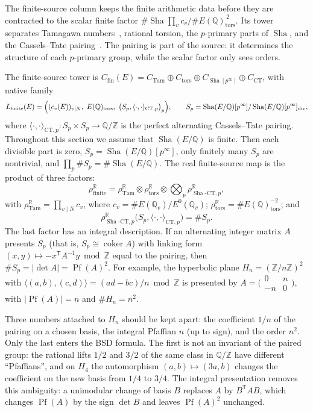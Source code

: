 \documentclass[11pt]{article}
\theoremstyle{definition}
\newcommand{\Q}{\mathbb{Q}}
\newcommand{\R}{\mathbb{R}}
\newcommand{\Z}{\mathbb{Z}}
\newcommand{\Sha}{\operatorname{Sha}}
\newcommand{\tors}{\operatorname{tors}}
\newcommand{\Pf}{\operatorname{Pf}}
\begin{document}
The finite-source column keeps the finite arithmetic data before they are
contracted to the scalar finite factor
$\#\Sha\prod_vc_v/\#E(\Q)_{\tors}^{\,2}$.  Its tower separates Tamagawa
numbers~\citep{Silverman1994}, rational torsion, the $p$-primary parts of
$\Sha$, and the Cassels--Tate pairing~\citep{Cassels1962,PoonenStoll1999}.
The pairing is part of the source: it determines the structure of each
$p$-primary group, while the scalar factor only sees orders.

\begin{definition}\label{def:apparatus:finite-source-map}
The finite-source tower is
$C_{\mathrm{fin}}(E)=C_{\mathrm{Tam}}\oplus C_{\tors}\oplus
C_{\Sha[p^\infty]}\oplus C_{\mathrm{CT}}$, with native family
\[
  L_{\mathrm{finite}}(E)
  =
  \Bigl((c_v(E))_{v\mid N},\ E(\Q)_{\tors},\
  \bigl(S_p,\langle\cdot,\cdot\rangle_{\mathrm{CT},p}\bigr)_p\Bigr),
  \qquad
  S_p=\Sha(E/\Q)[p^\infty]/\Sha(E/\Q)[p^\infty]_{\mathrm{div}},
\]
where $\langle\cdot,\cdot\rangle_{\mathrm{CT},p}:S_p\times S_p\to\Q/\Z$ is the
perfect alternating Cassels--Tate pairing.  Throughout this section we
assume that $\Sha(E/\Q)$ is finite.  Then each divisible part is zero,
$S_p=\Sha(E/\Q)[p^\infty]$, only finitely many $S_p$ are nontrivial, and
$\prod_p\#S_p=\#\Sha(E/\Q)$.  The real finite-source map is the product
of three factors:
\[
  \rho_{\mathrm{finite}}^{\R}
  =
  \rho_{\mathrm{Tam}}^{\R}
  \otimes
  \rho_{\tors}^{\R}
  \otimes
  \bigotimes_p \rho_{\Sha\text{-}\mathrm{CT},p}^{\R},
\]
with $\rho_{\mathrm{Tam}}^{\R}=\prod_{v\mid N}c_v$, where
$c_v=\#E(\Q_v)/E^0(\Q_v)$; $\rho_{\tors}^{\R}=\#E(\Q)_{\tors}^{-2}$; and
\[
  \rho_{\Sha\text{-}\mathrm{CT},p}^{\R}\bigl(S_p,\langle\cdot,\cdot\rangle_{\mathrm{CT},p}\bigr)=\#S_p .
\]
The last factor has an integral description.  If an alternating integer
matrix $A$ presents $S_p$ (that is, $S_p\cong\operatorname{coker}A$) with
linking form $(x,y)\mapsto -x^{\mathsf T}A^{-1}y \bmod \Z$ equal to the
pairing, then $\#S_p=|\det A|=\Pf(A)^2$.  For example, the hyperbolic
plane $H_n=(\Z/n\Z)^2$ with
$\langle(a,b),(c,d)\rangle=(ad-bc)/n \bmod \Z$ is presented by
$A=\bigl(\begin{smallmatrix}0&n\\-n&0\end{smallmatrix}\bigr)$, with
$|\Pf(A)|=n$ and $\#H_n=n^2$.
\end{definition}

Three numbers attached to $H_n$ should be kept apart: the coefficient $1/n$
of the pairing on a chosen basis, the integral Pfaffian $n$ (up to sign),
and the order $n^2$.  Only the last enters the BSD formula.  The first is
not an invariant of the paired group: the rational lifts $1/2$ and $3/2$
of the same class in $\Q/\Z$ have different ``Pfaffians'', and on $H_4$
the automorphism $(a,b)\mapsto(3a,b)$ changes the coefficient on the new
basis from $1/4$ to $3/4$.  The integral presentation removes this
ambiguity: a unimodular change of basis $B$ replaces $A$ by
$B^{\mathsf T}AB$, which changes $\Pf(A)$ by the sign $\det B$ and leaves
$\Pf(A)^2$ unchanged.
\end{document}

